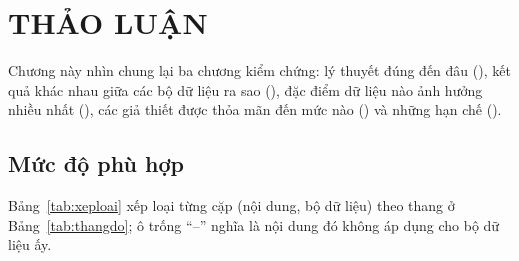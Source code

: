 \clearpage
\section[Thảo luận]{THẢO LUẬN}

Chương này nhìn chung lại ba chương kiểm chứng: lý thuyết đúng đến đâu (), kết quả khác nhau giữa các bộ dữ liệu ra sao (), đặc điểm dữ liệu nào ảnh hưởng nhiều nhất (), các giả thiết được thỏa mãn đến mức nào () và những hạn chế ().

\subsection{Mức độ phù hợp}

Bảng~\ref{tab:xeploai} xếp loại từng cặp (nội dung, bộ dữ liệu) theo thang ở Bảng~\ref{tab:thangdo}; ô trống ``--'' nghĩa là nội dung đó không áp dụng cho bộ dữ liệu ấy.

